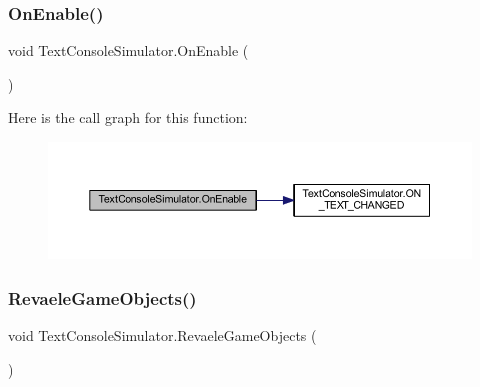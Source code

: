 \subsubsection{\texorpdfstring{On\+Enable()}{OnEnable()}}
{\footnotesize\ttfamily void Text\+Console\+Simulator.\+On\+Enable (\begin{DoxyParamCaption}{ }\end{DoxyParamCaption})\hspace{0.3cm}{\ttfamily [private]}}

Here is the call graph for this function\+:
\nopagebreak
\begin{figure}[H]
\begin{center}
\leavevmode
\includegraphics[width=350pt]{class_text_console_simulator_af32c7062f7ff475db935b844fa00927a_cgraph}
\end{center}
\end{figure}
\mbox{\label{class_text_console_simulator_ad7cf321e68b408092040fd1a6c2096cd}} 
\subsubsection{\texorpdfstring{Revaele\+Game\+Objects()}{RevaeleGameObjects()}}
{\footnotesize\ttfamily void Text\+Console\+Simulator.\+Revaele\+Game\+Objects (\begin{DoxyParamCaption}{ }\end{DoxyParamCaption})\hspace{0.3cm}{\ttfamily [private]}}

